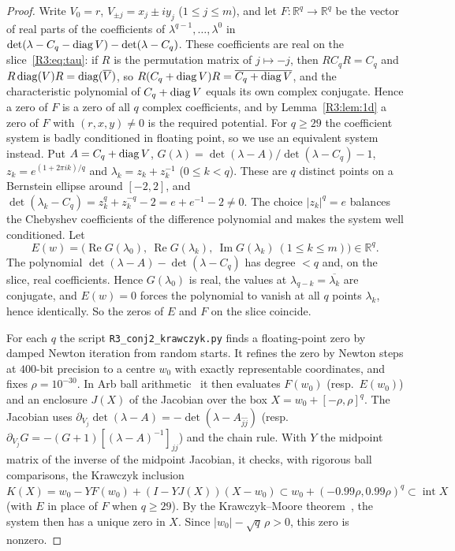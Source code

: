 \documentclass[11pt]{amsart}
\theoremstyle{definition}
\theoremstyle{remark}
\providecommand{\R}{\mathbb R}
\begin{document}
\begin{proof}
Write $V_0=r$, $V_{\pm j}=x_j\pm iy_j$ ($1\le j\le m$), and let
$F:\R^q\to\R^q$ be the vector of real parts of the coefficients of
$\lambda^{q-1},\dots,\lambda^0$ in $\det(\lambda-C_q-\operatorname{diag} V)-\det(\lambda-C_q)$.
These coefficients are real on the slice~\eqref{R3:eq:tau}: if $R$ is the
permutation matrix of $j\mapsto-j$, then $RC_qR=C_q$ and $R\operatorname{diag}(V)R=\operatorname{diag}(\overline V)$,
so $R(C_q+\operatorname{diag} V)R=\overline{C_q+\operatorname{diag} V}$, and the characteristic polynomial of
$C_q+\operatorname{diag} V$ equals its own complex conjugate. Hence a zero of $F$ is a zero of all
$q$ complex coefficients, and by Lemma~\ref{R3:lem:1d} a zero of $F$ with
$(r,x,y)\ne0$ is the required potential.
For $q\ge29$ the coefficient system is badly conditioned in floating point, so we
use an equivalent system instead. Put $A=C_q+\operatorname{diag} V$,
$G(\lambda)=\det(\lambda-A)/\det(\lambda-C_q)-1$, $z_k=e^{(1+2\pi ik)/q}$ and
$\lambda_k=z_k+z_k^{-1}$ ($0\le k<q$). These are $q$ distinct points on a Bernstein
ellipse around $[-2,2]$, and
$\det(\lambda_k-C_q)=z_k^q+z_k^{-q}-2=e+e^{-1}-2\neq0$. The choice $|z_k|^q=e$
balances the Chebyshev coefficients of the difference polynomial and makes the
system well conditioned. Let
\[
E(w)=\bigl(\operatorname{Re}G(\lambda_0),\ \operatorname{Re}G(\lambda_k),\ \operatorname{Im}G(\lambda_k)\ (1\le k\le m)\bigr)\in\R^q .
\]
The polynomial $\det(\lambda-A)-\det(\lambda-C_q)$ has degree $<q$ and, on the slice,
real coefficients. Hence $G(\lambda_0)$ is real, the values at
$\lambda_{q-k}=\overline{\lambda_k}$ are conjugate, and $E(w)=0$ forces the polynomial
to vanish at all $q$ points $\lambda_k$, hence identically. So the zeros of $E$ and
$F$ on the slice coincide.

For each $q$ the script \texttt{R3\_\allowbreak{}conj2\_\allowbreak{}krawczyk.py} finds a floating-point zero
by damped Newton iteration from random starts. It refines the zero by Newton steps
at $400$-bit precision to a centre $w_0$ with exactly representable coordinates,
and fixes $\rho=10^{-30}$. In Arb ball arithmetic~\cite{R3-Arb} it then evaluates
$F(w_0)$ (resp.\ $E(w_0)$) and an enclosure $J(X)$ of the Jacobian over the box
$X=w_0+[-\rho,\rho]^q$. The Jacobian uses
$\partial_{V_j}\det(\lambda-A)=-\det(\lambda-A_{\hat j\hat j})$
(resp.\ $\partial_{V_j}G=-(G+1)[(\lambda-A)^{-1}]_{jj}$) and the chain rule. With
$Y$ the midpoint matrix of the inverse of the midpoint Jacobian, it checks, with
rigorous ball comparisons, the Krawczyk inclusion
$K(X)=w_0-YF(w_0)+(I-YJ(X))(X-w_0)\subset w_0+(-0.99\rho,0.99\rho)^q\subset\operatorname{int}X$
(with $E$ in place of $F$ when $q\ge29$). By the Krawczyk--Moore
theorem~\cite{R3-Krawczyk,R3-Moore}, the system then has a unique zero in $X$.
Since $|w_0|-\sqrt q\,\rho>0$, this zero is nonzero.
\end{proof}
\end{document}
